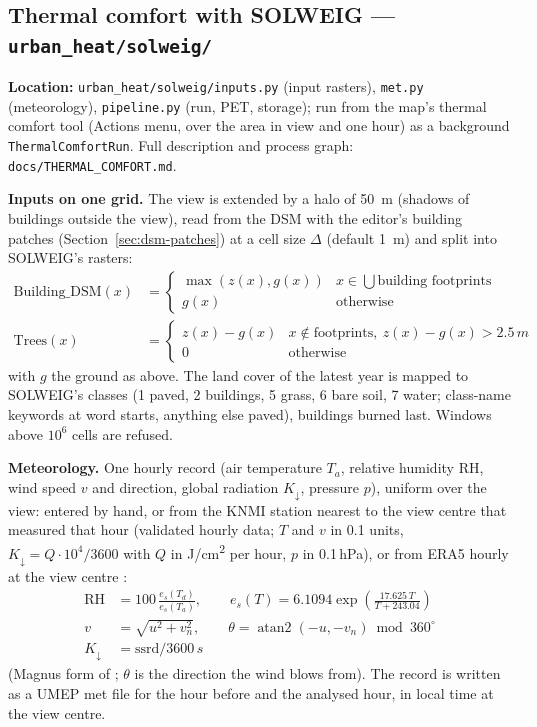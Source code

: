 \documentclass[11pt]{article}
\newcommand{\code}[1]{\texttt{#1}}
\begin{document}
\subsection{Thermal comfort with SOLWEIG --- \code{urban\_heat/solweig/}}
\label{sec:solweig}
\textbf{Location:} \code{urban\_heat/solweig/inputs.py} (input rasters), \code{met.py} (meteorology), \code{pipeline.py} (run, PET, storage); run from the map's thermal comfort tool (Actions menu, over the area in view and one hour) as a background \code{ThermalComfortRun}. Full description and process graph: \code{docs/THERMAL\_COMFORT.md}.

\textbf{Inputs on one grid.} The view is extended by a halo of \SI{50}{m} (shadows of buildings outside the view), read from the DSM with the editor's building patches (Section~\ref{sec:dsm-patches}) at a cell size $\Delta$ (default \SI{1}{m}) and split into SOLWEIG's rasters:
\begin{align}
  \text{Building\_DSM}(x) &= \begin{cases} \max(z(x), g(x)) & x \in \bigcup \text{building footprints} \\ g(x) & \text{otherwise} \end{cases} \\
  \text{Trees}(x) &= \begin{cases} z(x) - g(x) & x \notin \text{footprints},\ z(x) - g(x) > 2.5\,\si{m} \\ 0 & \text{otherwise} \end{cases}
\end{align}
with $g$ the ground as above. The land cover of the latest year is mapped to SOLWEIG's classes (1 paved, 2 buildings, 5 grass, 6 bare soil, 7 water; class-name keywords at word starts, anything else paved), buildings burned last. Windows above $10^6$ cells are refused.

\textbf{Meteorology.} One hourly record (air temperature $T_a$, relative humidity RH, wind speed $v$ and direction, global radiation $K_\downarrow$, pressure $p$), uniform over the view: entered by hand, or from the KNMI station nearest to the view centre that measured that hour (validated hourly data; $T$ and $v$ in 0.1 units, $K_\downarrow = Q \cdot 10^4 / 3600$ with $Q$ in \si{J/cm^2} per hour, $p$ in 0.1\,\si{hPa}), or from ERA5 hourly at the view centre \cite{Hersbach2020ERA5}:
\begin{align}
  \mathrm{RH} &= 100\,\frac{e_s(T_d)}{e_s(T_a)}, \qquad e_s(T) = 6.1094 \exp\!\left(\frac{17.625\,T}{T + 243.04}\right) \\
  v &= \sqrt{u^2 + v_{n}^2}, \qquad \theta = \operatorname{atan2}(-u, -v_{n}) \bmod 360^\circ \\
  K_\downarrow &= \mathrm{ssrd} / 3600\,\si{s}
\end{align}
(Magnus form of \cite{Alduchov1996Magnus}; $\theta$ is the direction the wind blows from). The record is written as a UMEP met file for the hour before and the analysed hour, in local time at the view centre.
\end{document}

